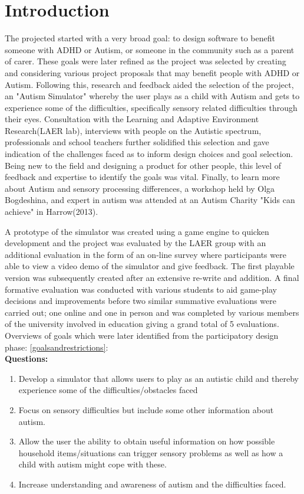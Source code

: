 \documentclass[11pt]{report}
\begin{document}
\tableofcontents


\chapter{Introduction}

The projected started with a very broad goal: to design software to benefit someone with ADHD or Autism, or someone in the community such as a parent of carer. These goals were later refined as the project was selected by creating and considering various project proposals that may benefit people with ADHD or Autism. Following this, research and feedback aided the selection of the project, an "Autism Simulator" whereby the user plays as a child with Autism and gets to experience some of the difficulties, specifically sensory related difficulties through their eyes. Consultation with the Learning and Adaptive Environment Research(LAER lab), interviews with people on the Autistic spectrum, professionals and school teachers further solidified this selection and gave indication of the challenges faced as to inform design choices and goal selection. Being new to the field and designing a product for other people, this level of feedback and expertise to identify the goals was vital. Finally, to learn more about Autism and sensory processing differences, a workshop held by Olga Bogdeshina, and expert in autism was attended at an Autism Charity "Kids can achieve" in Harrow(2013).

A prototype of the simulator was created using a game engine to quicken development and the project was evaluated by the LAER group with an additional evaluation in the form of an on-line survey where participants were able to view a video demo of the simulator and give feedback. The first playable version was subsequently created after an extensive re-write and addition. A final formative evaluation was conducted with various students to aid game-play decisions and improvements before two similar summative evaluations were carried out; one online and one in person and was completed by various members of the university involved in education giving a grand total of 5 evaluations. \\

Overviews of goals which were later identified from the participatory design phase:
\ref{goalsandrestrictions}:\\
\textbf{Questions:}\\
\begin{enumerate}
\item Develop a simulator that allows users to play as an autistic child and thereby experience some of the difficulties/obstacles faced
\item Focus on sensory difficulties but include some other information about autism.
\item Allow the user the ability to obtain useful information on how possible household items/situations can trigger sensory problems as well as how a child with autism might cope with these.
\item Increase understanding and awareness of autism and the difficulties faced.
\end{enumerate}
\end{document}
